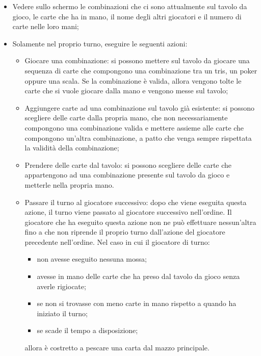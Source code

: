 \begin{itemize}
    \item Vedere sullo schermo le combinazioni che ci sono attualmente sul tavolo da gioco, le carte che ha in mano, il nome degli altri giocatori e il numero di carte nelle loro mani;
    \item Solamente nel proprio turno, eseguire le seguenti azioni:
    \begin{itemize}
        \item Giocare una combinazione: si possono mettere sul tavolo da giocare una sequenza di carte che compongono una combinazione tra un tris, un poker oppure una scala.
        Se la combinazione è valida, allora vengono tolte le carte che si vuole giocare dalla mano e vengono messe sul tavolo;
        \item Aggiungere carte ad una combinazione sul tavolo già esistente: si possono scegliere delle carte dalla propria mano, che non necessariamente compongono una combinazione valida e mettere assieme alle carte che compongono un’altra combinazione, a patto che venga sempre rispettata la validità della combinazione;
        \item Prendere delle carte dal tavolo: si possono scegliere delle carte che appartengono ad una combinazione presente sul tavolo da gioco e metterle nella propria mano.
        \item Passare il turno al giocatore successivo: dopo che viene eseguita questa azione, il turno viene passato al giocatore successivo nell’ordine.
        Il giocatore che ha eseguito questa azione non ne può effettuare nessun’altra fino a che non riprende il proprio turno dall’azione del giocatore precedente nell’ordine.
        Nel caso in cui il giocatore di turno:
        \begin{itemize}
            \item non avesse eseguito nessuna mossa;
            \item avesse in mano delle carte che ha preso dal tavolo da gioco senza averle rigiocate;
            \item se non si trovasse con meno carte in mano rispetto a quando ha iniziato il turno;
            \item se scade il tempo a disposizione;
        \end{itemize}
        allora è costretto a pescare una carta dal mazzo principale.
    \end{itemize}
\end{itemize}

